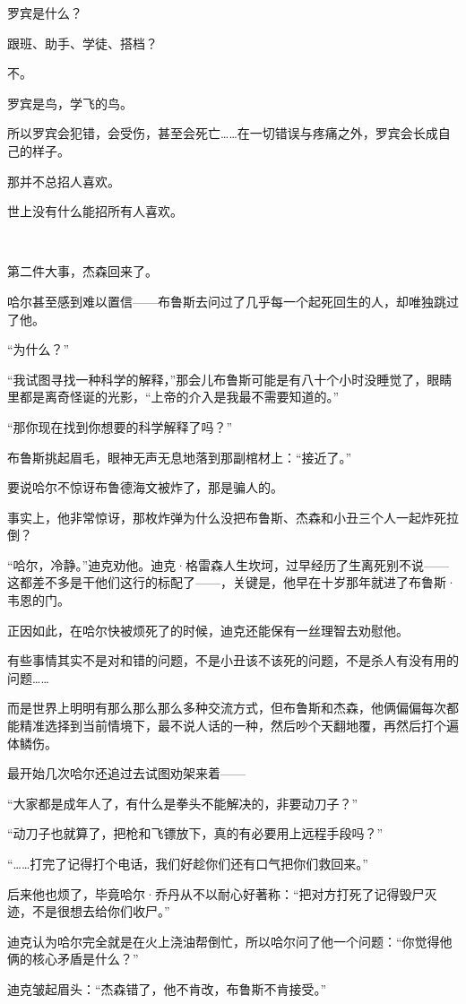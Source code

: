 \documentclass[../main]{subfiles}
\begin{document}
罗宾是什么？

跟班、助手、学徒、搭档？

不。

罗宾是鸟，学飞的鸟。

所以罗宾会犯错，会受伤，甚至会死亡……在一切错误与疼痛之外，罗宾会长成自己的样子。

那并不总招人喜欢。

世上没有什么能招所有人喜欢。

~\

第二件大事，杰森回来了。

哈尔甚至感到难以置信——布鲁斯去问过了几乎每一个起死回生的人，却唯独跳过了他。

“为什么？”

“我试图寻找一种科学的解释，”那会儿布鲁斯可能是有八十个小时没睡觉了，眼睛里都是离奇怪诞的光影，“上帝的介入是我最不需要知道的。”

“那你现在找到你想要的科学解释了吗？”

布鲁斯挑起眉毛，眼神无声无息地落到那副棺材上：“接近了。”

要说哈尔不惊讶布鲁德海文被炸了，那是骗人的。

事实上，他非常惊讶，那枚炸弹为什么没把布鲁斯、杰森和小丑三个人一起炸死拉倒？

“哈尔，冷静。”迪克劝他。迪克·格雷森人生坎坷，过早经历了生离死别不说——这都差不多是干他们这行的标配了——，关键是，他早在十岁那年就进了布鲁斯·韦恩的门。

正因如此，在哈尔快被烦死了的时候，迪克还能保有一丝理智去劝慰他。

有些事情其实不是对和错的问题，不是小丑该不该死的问题，不是杀人有没有用的问题……

而是世界上明明有那么那么那么多种交流方式，但布鲁斯和杰森，他俩偏偏每次都能精准选择到当前情境下，最不说人话的一种，然后吵个天翻地覆，再然后打个遍体鳞伤。

最开始几次哈尔还追过去试图劝架来着——

“大家都是成年人了，有什么是拳头不能解决的，非要动刀子？”

“动刀子也就算了，把枪和飞镖放下，真的有必要用上远程手段吗？”

“……打完了记得打个电话，我们好趁你们还有口气把你们救回来。”

后来他也烦了，毕竟哈尔·乔丹从不以耐心好著称：“把对方打死了记得毁尸灭迹，不是很想去给你们收尸。”

迪克认为哈尔完全就是在火上浇油帮倒忙，所以哈尔问了他一个问题：“你觉得他俩的核心矛盾是什么？”

迪克皱起眉头：“杰森错了，他不肯改，布鲁斯不肯接受。”
\end{document}
